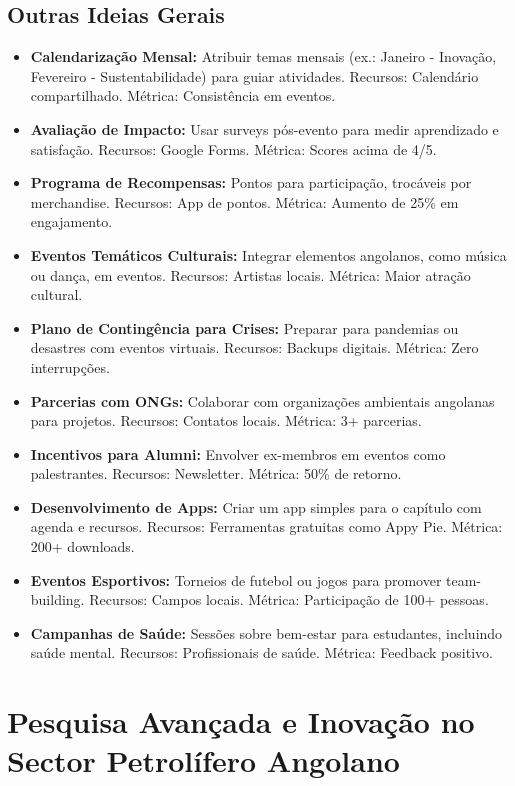 \documentclass[12pt]{article}
\begin{document}
\subsection{Outras Ideias Gerais}
\begin{itemize}
    \item \textbf{Calendarização Mensal:} Atribuir temas mensais (ex.: Janeiro - Inovação, Fevereiro - Sustentabilidade) para guiar atividades. Recursos: Calendário compartilhado. Métrica: Consistência em eventos.
    \item \textbf{Avaliação de Impacto:} Usar surveys pós-evento para medir aprendizado e satisfação. Recursos: Google Forms. Métrica: Scores acima de 4/5.
    \item \textbf{Programa de Recompensas:} Pontos para participação, trocáveis por merchandise. Recursos: App de pontos. Métrica: Aumento de 25\% em engajamento.
    \item \textbf{Eventos Temáticos Culturais:} Integrar elementos angolanos, como música ou dança, em eventos. Recursos: Artistas locais. Métrica: Maior atração cultural.
    \item \textbf{Plano de Contingência para Crises:} Preparar para pandemias ou desastres com eventos virtuais. Recursos: Backups digitais. Métrica: Zero interrupções.
    \item \textbf{Parcerias com ONGs:} Colaborar com organizações ambientais angolanas para projetos. Recursos: Contatos locais. Métrica: 3+ parcerias.
    \item \textbf{Incentivos para Alumni:} Envolver ex-membros em eventos como palestrantes. Recursos: Newsletter. Métrica: 50\% de retorno.
    \item \textbf{Desenvolvimento de Apps:} Criar um app simples para o capítulo com agenda e recursos. Recursos: Ferramentas gratuitas como Appy Pie. Métrica: 200+ downloads.
    \item \textbf{Eventos Esportivos:} Torneios de futebol ou jogos para promover team-building. Recursos: Campos locais. Métrica: Participação de 100+ pessoas.
    \item \textbf{Campanhas de Saúde:} Sessões sobre bem-estar para estudantes, incluindo saúde mental. Recursos: Profissionais de saúde. Métrica: Feedback positivo.
\end{itemize}

\section{Pesquisa Avançada e Inovação no Sector Petrolífero Angolano}
\end{document}

